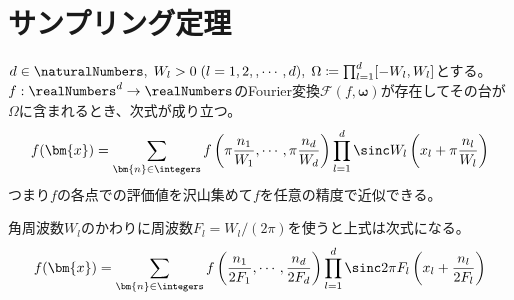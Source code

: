 	\chapter{サンプリング定理}
		\begin{shadebox}
			$d\in\naturalNumbers,\;W_l>0\;(l=1,2,,\cdots,d),\;\Omega\coloneqq\prod_{l=1}^d [-W_l,W_l]$とする。
			$f:\realNumbers^d\to\realNumbers$のFourier変換$\mathcal{F}(f,\bm{\omega})$が存在してその台が$\Omega$に含まれるとき、次式が成り立つ。
			\[ f(\bm{x}) = \sum_{\bm{n}\in\integers}f\left(\pi\frac{n_1}{W_1},\cdots,\pi\frac{n_d}{W_d}\right)\prod_{l=1}^d\sinc W_l\left(x_l + \pi\frac{n_l}{W_l}\right) \]
			つまり$f$の各点での評価値を沢山集めて$f$を任意の精度で近似できる。
			\par
			角周波数$W_l$のかわりに周波数$F_l=W_l/(2\pi)$を使うと上式は次式になる。
			\[ f(\bm{x}) = \sum_{\bm{n}\in\integers}f\left(\frac{n_1}{2F_1},\cdots,\frac{n_d}{2F_d}\right)\prod_{l=1}^d\sinc 2\pi F_l\left(x_l + \frac{n_l}{2F_l}\right) \]
		\end{shadebox}
